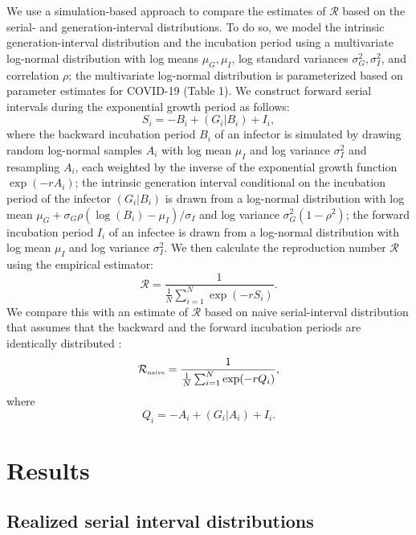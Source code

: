 \documentclass[12pt]{article}
\newcommand{\RR}{\ensuremath{{\mathcal R}}\xspace}
\newcommand{\Rnaive}{\ensuremath{{\mathcal R}_{\textrm{\tiny naive}}}\xspace}
\begin{document}
We use a simulation-based approach to compare the estimates of \RR based on the serial- and generation-interval distributions. 
To do so, we model the intrinsic generation-interval distribution and the incubation period using a multivariate log-normal distribution with log means $\mu_G, \mu_I$, log standard variances $\sigma_G^2, \sigma_I^2$, and correlation $\rho$;
the multivariate log-normal distribution is parameterized based on parameter estimates for COVID-19 (Table 1).
We construct forward serial intervals during the exponential growth period as follows:
\begin{equation}
S_i = -B_i + (G_i|B_i) + I_i,
\end{equation}
where the backward incubation period $B_i$ of an infector is simulated by drawing random log-normal samples $A_i$ with log mean $\mu_I$ and log variance $\sigma_I^2$ and resampling $A_i$, each weighted by the inverse of the exponential growth function $\exp(-rA_i)$;
the intrinsic generation interval conditional on the incubation period of the infector $(G_i|B_i)$ is drawn from a log-normal distribution with log mean $\mu_G + \sigma_G \rho (\log(B_i) - \mu_I)/\sigma_I$ and log variance $\sigma_G^2 (1-\rho^2)$;
the forward incubation period $I_i$ of an infectee is drawn from a log-normal distribution with log mean $\mu_I$ and log variance $\sigma_I^2$.
We then calculate the reproduction number \RR using the empirical estimator:
\begin{equation}
\RR = \frac{1}{\frac{1}{N}\sum_{i=1}^N \exp(- r S_i)}.
\end{equation}
We compare this with an estimate of \RR based on naive serial-interval distribution that assumes that the backward and the forward incubation periods are identically distributed \citep{svensson2007note,klinkenberg2011correlation,champredon2018equivalence, britton2019estimation}:
\begin{equation}
  \Rnaive = \frac{1}{\frac{1}{N}\sum_{i=1}^N \exp(- r Q_i)},
\end{equation}
where
\begin{equation}
Q_i = -A_i + (G_i|A_i) + I_i.
\end{equation}

\section{Results}

\subsection{Realized serial interval distributions}
\end{document}
